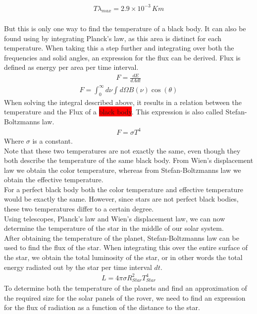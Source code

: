 \documentclass[reprint,english,notitlepage]{revtex4-2}
\begin{document}
\begin{align*}
    T\lambda_{max} = 2.9 \times 10^{-3} \, Km
\end{align*}\\
But this is only one way to find the temperature of a black body.
It can also be found using by integrating Planck's law, as this area is distinct for each temperature.
When taking this a step further and integrating over both the frequencies and solid angles, an expression for the flux can be derived.
Flux is defined as energy per area per time interval.
\begin{align*}
    F = \frac{dE}{dA dt}
\end{align*}
\begin{align*}
    F = \int_{0}^{\infty} d\nu \int_{}^{} d\Omega B(\nu) \cos\left(\theta\right)
\end{align*}
When solving the integral described above, it results in a relation between the temperature and the Flux of a \colorbox{red}{black body}.
This expression is also called Stefan-Boltzmanns law.
\begin{align*}
    F = \sigma T^4
\end{align*}
Where $\sigma$ is a constant.\\
Note that these two temperatures are not exactly the same, even though they both describe the temperature of the same black body.
From Wien's displacement law we obtain the color temperature, whereas from Stefan-Boltzmanns law we obtain the effective temperature.\\
For a perfect black body both the color temperature and effective temperature would be exactly the same.
However, since stars are not perfect black bodies, these two temperatures differ to a certain degree.\\
Using telescopes, Planck's law and Wien's displacement law, we can now determine the temperature of the star in the middle of our solar system.\\
After obtaining the temperature of the planet, Stefan-Boltzmanns law can be used to find the flux of the star.
When integrating this over the entire surface of the star, we obtain the total luminosity of the star, or in other words the total energy radiated out by the star per time interval $dt$.
\begin{align}
    L = 4 \pi \sigma R_{Star}^2 T_{Star}^4 \label{Luminosity}
\end{align}
To determine both the temperature of the planets and find an approximation of the required size for the solar panels of the rover, we need to find an expression for the flux of radiation as a function of the distance to the star.
\end{document}
